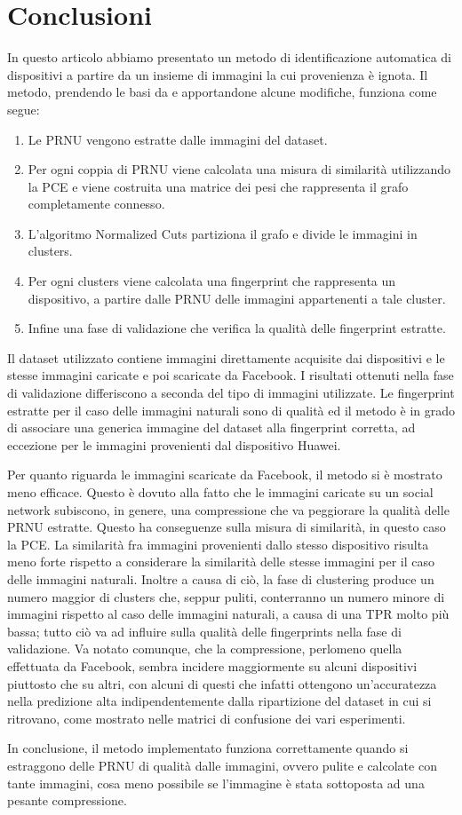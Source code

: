 \section{Conclusioni}

In questo articolo abbiamo presentato un metodo di identificazione automatica di dispositivi a partire da un insieme di immagini la cui provenienza è ignota. Il metodo, prendendo le basi da \cite{ Amerini2014831} e apportandone alcune modifiche, funziona come segue:
\begin{enumerate}
\item Le PRNU vengono estratte dalle immagini del dataset. 
\item Per ogni coppia di PRNU viene calcolata una misura di similarità utilizzando la PCE e viene costruita una matrice dei pesi che rappresenta il grafo completamente connesso.
\item L'algoritmo Normalized Cuts partiziona il grafo e divide le immagini in clusters.
\item Per ogni clusters viene calcolata una fingerprint che rappresenta un dispositivo, a partire dalle PRNU delle immagini appartenenti a tale cluster.
\item Infine una fase di validazione che verifica la qualità delle fingerprint estratte.
\end{enumerate}

Il dataset utilizzato contiene immagini direttamente acquisite dai dispositivi e le stesse immagini caricate e poi scaricate da Facebook. I risultati ottenuti nella fase di validazione differiscono a seconda del tipo di immagini utilizzate. Le fingerprint estratte per il caso delle immagini naturali sono di qualità ed il metodo è in grado di associare una generica immagine del dataset alla fingerprint corretta, ad eccezione per le immagini provenienti dal dispositivo Huawei.

Per quanto riguarda le immagini scaricate da Facebook, il metodo si è mostrato meno efficace. Questo è dovuto alla fatto che le immagini caricate su un social network subiscono, in genere, una compressione che va peggiorare la qualità delle PRNU estratte. Questo ha conseguenze sulla misura di similarità, in questo caso la PCE. La similarità fra immagini provenienti dallo stesso dispositivo risulta meno forte rispetto a considerare la similarità delle stesse immagini per il caso delle immagini naturali. Inoltre a causa di ciò, la fase di clustering produce un numero maggior di clusters che, seppur puliti, conterranno un numero minore di immagini rispetto al caso delle immagini naturali, a causa di una TPR molto più bassa; tutto ciò va ad influire sulla qualità delle fingerprints nella fase di validazione. Va notato comunque, che la compressione, perlomeno quella effettuata da Facebook, sembra incidere maggiormente su alcuni dispositivi piuttosto che su altri, con alcuni di questi che infatti ottengono un'accuratezza nella predizione alta indipendentemente dalla ripartizione del dataset in cui si ritrovano, come mostrato nelle matrici di confusione dei vari esperimenti.

In conclusione, il metodo implementato funziona correttamente quando si estraggono delle PRNU di qualità dalle immagini, ovvero pulite e calcolate con tante immagini, cosa meno possibile se l'immagine è stata sottoposta ad una pesante compressione.